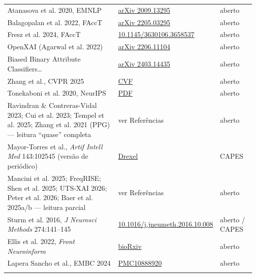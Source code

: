 \documentclass[11pt,a4paper]{article}
\begin{document}
{\begin{xltabular}{\linewidth}{>{\raggedright\arraybackslash}X>{\raggedright\arraybackslash}X>{\raggedright\arraybackslash}X}
Atanasova et al. 2020, EMNLP & \href{https://arxiv.org/abs/2009.13295}{arXiv 2009.13295} & aberto \\ \addlinespace[1pt]
Balagopalan et al. 2022, FAccT & \href{https://arxiv.org/abs/2205.03295}{arXiv 2205.03295} & aberto \\ \addlinespace[1pt]
Fresz et al. 2024, FAccT & \href{https://arxiv.org/abs/2406.05068}{10.1145/3630106.3658537} & aberto \\ \addlinespace[1pt]
OpenXAI (Agarwal et al. 2022) & \href{https://arxiv.org/abs/2206.11104}{arXiv 2206.11104} & aberto \\ \addlinespace[1pt]
Biased Binary Attribute Classifiers… & \href{https://arxiv.org/html/2403.14435}{arXiv 2403.14435} & aberto \\ \addlinespace[1pt]
Zhang et al., CVPR 2025 & \href{https://openaccess.thecvf.com/content/CVPR2025/papers/Zhang_Towards_Fine-Grained_Interpretability_Counterfactual_Explanations_for_Misclassification_with_Saliency_Partition_CVPR_2025_paper.pdf}{CVF} & aberto \\ \addlinespace[1pt]
Tonekaboni et al. 2020, NeurIPS & \href{https://proceedings.nips.cc/paper_files/paper/2020/file/08fa43588c2571ade19bc0fa5936e028-Paper.pdf}{PDF} & aberto \\ \addlinespace[1pt]
Ravindran \& Contreras-Vidal 2023; Cui et al. 2023; Tempel et al. 2025; Zhang et al. 2021 (PPG) — leitura ``quase'' completa & ver Referências & aberto \\ \addlinespace[1pt]
Mayor-Torres et al., \textit{Artif Intell Med} 143:102545 (versão de periódico) & \href{https://researchdiscovery.drexel.edu/esploro/outputs/journalArticle/Evaluation-of-interpretability-for-deep-learning/991021861849404721}{Drexel} & CAPES \\ \addlinespace[1pt]
Mancini et al. 2025; FreqRISE; Shen et al. 2025; UTS-XAI 2026; Peter et al. 2026; Baer et al. 2025a/b — leitura parcial & ver Referências & aberto \\ \addlinespace[1pt]
Sturm et al. 2016, \textit{J Neurosci Methods} 274:141–145 & \href{https://arxiv.org/abs/1604.08201}{10.1016/j.jneumeth.2016.10.008} & aberto / CAPES \\ \addlinespace[1pt]
Ellis et al. 2022, \textit{Front Neuroinform} & \href{https://www.biorxiv.org/content/10.1101/2021.07.14.452360v2}{bioRxiv} & aberto \\ \addlinespace[1pt]
Lapera Sancho et al., EMBC 2024 & \href{https://pmc.ncbi.nlm.nih.gov/articles/PMC10888920/}{PMC10888920} & aberto \\ \addlinespace[1pt]

\end{xltabular}}
\end{document}
